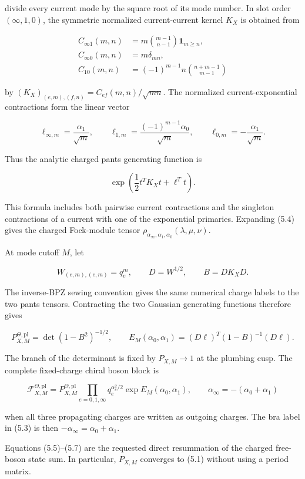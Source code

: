 \documentclass[11pt]{article}
\begin{document}
divide every current mode by the square root of its mode number.  In slot
order \((\infty,1,0)\), the symmetric normalized current-current kernel
\(K_X\) is obtained from

\[
\begin{aligned}
C_{\infty1}(m,n)&=
 m\binom{m-1}{n-1}\mathbf1_{m\ge n},\\
C_{\infty0}(m,n)&=m\delta_{mn},\\
C_{10}(m,n)&=(-1)^{m-1}n\binom{n+m-1}{m-1}
\end{aligned}
\tag{5.2}
\]

by \((K_X)_{(e,m),(f,n)}=C_{ef}(m,n)/\sqrt{mn}\).  The normalized
current-exponential contractions form the linear vector

\[
 \ell_{\infty,m}=\frac{\alpha_1}{\sqrt m},\qquad
 \ell_{1,m}=\frac{(-1)^{m-1}\alpha_0}{\sqrt m},\qquad
 \ell_{0,m}=-\frac{\alpha_1}{\sqrt m}.
\tag{5.3}
\]

Thus the analytic charged pants generating function is

\[
 \exp\!\left(\frac12t^TK_Xt+\ell^Tt\right).
\tag{5.4}
\]

This formula includes both pairwise current contractions and the singleton
contractions of a current with one of the exponential primaries.  Expanding
(5.4) gives the charged Fock-module tensor
\(\rho_{\alpha_\infty,\alpha_1,\alpha_0}(\lambda,\mu,\nu)\).

At mode cutoff \(M\), let

\[
 W_{(e,m),(e,m)}=q_e^m,\qquad D=W^{1/2},\qquad B=DK_XD.
\tag{5.5}
\]

The inverse-BPZ sewing convention gives the same numerical charge labels to
the two pants tensors.  Contracting the two Gaussian generating functions
therefore gives

\[
 P_{X,M}^{\Theta,\mathrm{pl}}
 =\det(1-B^2)^{-1/2},
\qquad
 E_M(\alpha_0,\alpha_1)
 =(D\ell)^T(1-B)^{-1}(D\ell).
\tag{5.6}
\]

The branch of the determinant is fixed by \(P_{X,M}\to1\) at the plumbing
cusp.  The complete fixed-charge chiral boson block is

\[
 \mathcal F_{X,M}^{\Theta,\mathrm{pl}}
 =P_{X,M}^{\Theta,\mathrm{pl}}
  \prod_{e=0,1,\infty}q_e^{\alpha_e^2/2}
  \exp E_M(\alpha_0,\alpha_1),
 \qquad
 \alpha_\infty=-(\alpha_0+\alpha_1)
\tag{5.7}
\]

when all three propagating charges are written as outgoing charges.  The
bra label in (5.3) is then \(-\alpha_\infty=\alpha_0+\alpha_1\).

Equations (5.5)--(5.7) are the requested direct resummation of the charged
free-boson state sum.  In particular, \(P_{X,M}\) converges to (5.1) without
using a period matrix.
\end{document}
